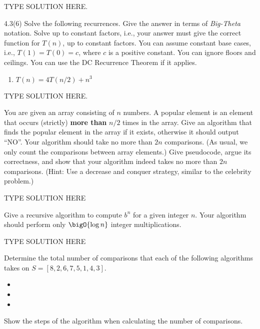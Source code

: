 \documentclass[draft]{article}
\begin{document}
\begin{solution}
    TYPE SOLUTION HERE.
\end{solution}

\begin{exercise}{4.3(6)}
    Solve the following recurrences. Give the answer in terms of \emph{Big-Theta} notation.  Solve up to constant
    factors, i.e., your answer must give the correct function for $T(n)$, up to constant factors.
    You can  assume constant base cases, i.e., $T(1) = T(0) = c$, where $c$ is a positive constant.
    You can ignore floors and ceilings. You can use the DC Recurrence Theorem if it applies.
    \begin{enumerate}[start=6, label=\arabic*.]
        \item $T(n) = 4 T(n/2) + n^3$
    \end{enumerate}
\end{exercise}

\begin{solution}
    TYPE SOLUTION HERE.
\end{solution}

\begin{exercise}{4.4}
    You are given an array consisting of $n$ numbers. A popular element is an element
    that occurs (strictly) \textbf{more than} $n/2$ times in the array. Give an algorithm that finds
    the popular element in the array if it exists, otherwise it should output ``NO''. Your algorithm should take no more than $2n$ comparisons. (As usual, we only count the comparisons between array elements.)
    Give pseudocode, argue its correctness, and show that your algorithm indeed takes no more than $2n$ comparisons.
    (Hint: Use a decrease and conquer strategy, similar to the celebrity problem.)
\end{exercise}

\begin{solution}
    TYPE SOLUTION HERE
\end{solution}

\begin{exercise}{4.8}
    Give a recursive algorithm to compute $b^n$ for a given integer $n$.
    Your algorithm should perform only $\bigO{\log{n}}$ integer multiplications.
\end{exercise}

\begin{solution}
    TYPE SOLUTION HERE
\end{solution}

\begin{exercise}{5.1}
    Determine the total number of comparisons that each of the following algorithms takes on $S = [8, 2, 6, 7, 5, 1, 4, 3]$.
    \begin{itemize}[nosep]
        \item {}
        \item {}
        \item {}
    \end{itemize}
    Show the steps of the algorithm when calculating the number of comparisons.
\end{exercise}
\end{document}
